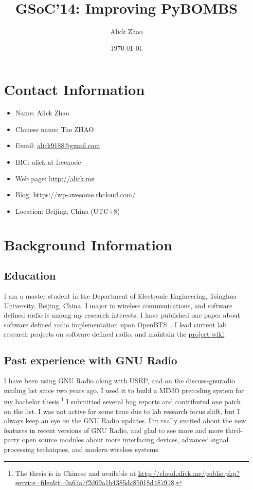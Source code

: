 \documentclass[a4paper]{article}
\begin{document}
\title{GSoC'14: Improving PyBOMBS}
\author{Alick Zhao}
\date{\today}
\maketitle

\section{Contact Information}

\begin{itemize}[noitemsep]
  \item Name: Alick Zhao
  \item Chinese name: Tao ZHAO
  \item Email: \url{alick9188@gmail.com}
  \item IRC: alick at freenode
  \item Web page: \url{http://alick.me}
  \item Blog: \url{https://wp-awesome.rhcloud.com/}
  \item Location: Beijing, China (UTC+8)
\end{itemize}

\section{Background Information}

\subsection{Education}

I am a master student in the Department of Electronic Engineering, Tsinghua
University, Beijing, China. I major in wireless communications, and
software defined radio is among my research interests. I have published
one paper about software defined radio implementation upon
OpenBTS~\cite{zhao2013software}. I lead current lab research projects on
software defined radio, and maintain the
\href{http://network.ee.tsinghua.edu.cn/grwiki/}{project wiki}.

\subsection{Past experience with GNU Radio}

I have been using GNU Radio along with USRP, and
on the discuss-gnuradio mailing list since two years ago.
I used it to build a MIMO precoding system for my bachelor thesis.\footnote{%
The thesis is in Chinese and available at %
\url{http://cloud.alick.me/public.php?service=files&t=0a67a7f2d09a1b4385dc85018d487918}.}%
I submitted several bug reports and contributed one patch on the list.
I was not active for some time due to lab research focus shift, but I
always keep an eye on the GNU Radio updates.  I'm really excited about
the new features in recent versions of GNU Radio, and glad to see more and more
third-party open source modules about more interfacing devices, advanced
signal processing techniques, and modern wireless systems.
\end{document}
